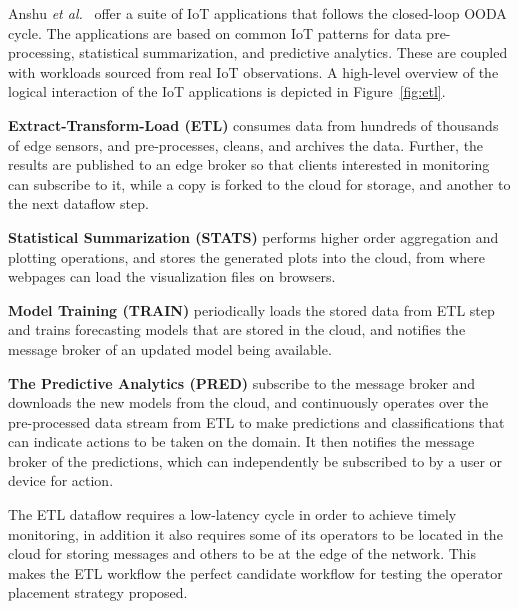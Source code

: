 Anshu \textit{et al.}~\cite{RIoTBench} offer a suite of IoT applications that follows the closed-loop \ac{OODA} cycle. The applications are based on common IoT patterns for data pre-processing, statistical summarization, and predictive analytics. These are coupled with workloads sourced from real IoT observations. A high-level overview of the logical interaction of the IoT applications is depicted in Figure~\ref{fig:etl}.

\textbf{Extract-Transform-Load (ETL)} consumes data from hundreds of thousands of edge sensors, and pre-processes, cleans, and archives the data. Further, the results are published to an edge broker so that clients interested in monitoring can subscribe to it, while a copy is forked to the cloud for storage, and another to the next dataflow step.

\textbf{Statistical Summarization (STATS)} performs higher order aggregation and plotting operations, and stores the generated plots into the cloud, from where webpages can load the visualization files on browsers. 

\textbf{Model Training (TRAIN)} periodically loads the stored data from ETL step and trains forecasting models that are stored in the cloud, and notifies the message broker of an updated model being available. 

\textbf{The Predictive Analytics (PRED)} subscribe to the message broker and downloads the new models from the cloud, and continuously operates over the pre-processed data stream from ETL to make predictions and classifications that can indicate actions to be taken on the domain. It then notifies the message broker of the predictions, which can independently be subscribed to by a user or device for action. 

The ETL dataflow requires a low-latency cycle in order to achieve timely monitoring, in addition it also requires some of its operators to be located in the cloud for storing messages and others to be at the edge of the network. This makes the ETL workflow the perfect candidate workflow for testing the operator placement strategy proposed. 